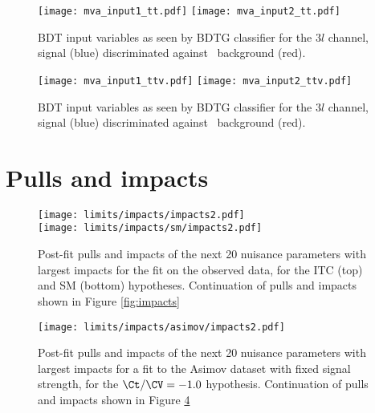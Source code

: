 \begin{figure} [!h]
  \centering
  \texttt{[image: mva\_input1\_tt.pdf]}
  \texttt{[image: mva\_input2\_tt.pdf]}
  \caption[BDT input variables. Discrimination against \ttbar in $3l$ channel.]{BDT input variables as seen by BDTG classifier for the $3l$ channel, \tHq signal (blue) discriminated against \ttbar\ background (red).}
  \label{mva_input_tt}
\end{figure}

\begin{figure} [!h]
  \centering
  \texttt{[image: mva\_input1\_ttv.pdf]}
  \texttt{[image: mva\_input2\_ttv.pdf]}
  \caption[BDT input variables. Discrimination against \ttV\ in $3l$ channel.]{BDT input variables as seen by BDTG classifier for the $3l$ channel, \tHq signal (blue) discriminated against \ttV\ background (red).}
\label{mva_input_ttv}
\end{figure}

\clearpage
\section{Pulls and impacts}\label{pulls_impacts_add}

\begin{figure} [!th]
  \centering  
  \texttt{[image: limits/impacts/impacts2.pdf]}\\
  \texttt{[image: limits/impacts/sm/impacts2.pdf]}
  \caption[Additional post-fit pulls and impacts.]{Post-fit pulls and impacts of the next 20 nuisance parameters with largest impacts for the fit on the observed data, for the ITC (top) and SM (bottom) hypotheses. Continuation of pulls and impacts shown in Figure \ref{fig:impacts}}
  \label{fig:impacts2}
\end{figure}

  \begin{figure} [!h]
    \centering
    \texttt{[image: limits/impacts/asimov/impacts2.pdf]}\\
    \caption[Additional post-fit pulls an impacts for a fit to the Asimov dataset.]{Post-fit pulls and impacts of the next 20 nuisance parameters with largest impacts for a fit to the Asimov dataset with fixed signal strength, for the $\Ct/\CV=-1.0$ hypothesis. Continuation of pulls and impacts shown in Figure \ref{fig:impacts_asimov2}}
    \label{fig:impacts_asimov2}
  \end{figure}
